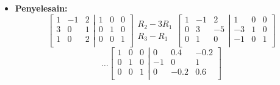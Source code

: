 \documentclass[pdflatex,compress,mathserif]{beamer}
\begin{document}
\begin{frame}
	\begin{itemize}
		\item \textbf{Penyelesain:}
		\[
			\left[
				\begin{matrix}
					1 & -1 & 2 \\
					3 & 0 & 1 \\
					1 & 0 & 2 \\
				\end{matrix}
			\right|
			\left.
				\begin{matrix}
					1 & 0 & 0 \\
					0 & 1 & 0 \\
					0 & 0 & 1 \\
				\end{matrix}
			\right]
			\begin{matrix}
				\\
				R_2 - 3R_1 \\
				R_3 - R_1\\
			\end{matrix}
			\left[
				\begin{matrix}
					1 & -1 & 2 \\
					0 & 3 & -5 \\
					0 & 1 & 0 \\
				\end{matrix}
			\right|
			\left.
				\begin{matrix}
					1 & 0 & 0 \\
					-3 & 1 & 0 \\
					-1 & 0 & 1 \\
				\end{matrix}
			\right]
		\]
		\[
		\dots
		\left[
			\begin{matrix}
				1 & 0 & 0 \\
				0 & 1 & 0 \\
				0 & 0 & 1 \\
			\end{matrix}
		\right|
		\left.
			\begin{matrix}
				0 & 0.4 & -0.2 \\
				-1 & 0 & 1 \\
				0 & -0.2 & 0.6 \\
			\end{matrix}
		\right]
		\]
	\end{itemize}
\end{frame}
\end{document}
